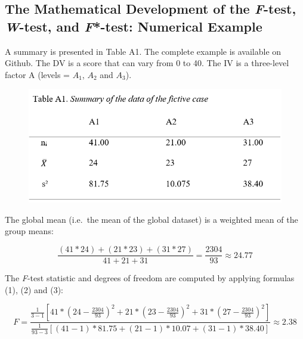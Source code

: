 \clearpage
\makeatletter
\efloat@restorefloats
\makeatother


\begin{appendix}
\section{}
\hypertarget{the-mathematical-development-of-the-f-test-w-test-and-f-test-numerical-example}{%
\subsection{\texorpdfstring{The Mathematical Development of the
\emph{F}-test, \emph{W}-test, and \emph{F}*-test: Numerical
Example}{The Mathematical Development of the F-test, W-test, and F*-test: Numerical Example}}\label{the-mathematical-development-of-the-f-test-w-test-and-f-test-numerical-example}}

A summary is presented in Table A1. The complete example is available on
Github. The DV is a score that can vary from 0 to 40. The IV is a
three-level factor A (levels = \(A_1\), \(A_2\) and \(A_3\)).

\begin{figure}
\includegraphics[width=1\linewidth]{Rmarkdown folder/Rmarkdown inputs/TableA1} \end{figure}

The global mean (i.e.~the mean of the global dataset) is a weighted mean
of the group means:

\[\frac{(41*24)+(21*23)+(31*27)}{41+21+31}=\frac{2304}{93} \approx 24.77\]

The \emph{F}-test statistic and degrees of freedom are computed by
applying formulas (1), (2) and (3):

\[
F=\frac{\frac{1}{3-1}[41*(24-\frac{2304}{93})^2+21*(23-\frac{2304}{93})^2+31*(27-\frac{2304}{93})^2]}
{\frac{1}{93-3}[(41-1)*81.75+(21-1)*10.07+(31-1)*38.40]} \approx 2.38
\]


\end{appendix}
